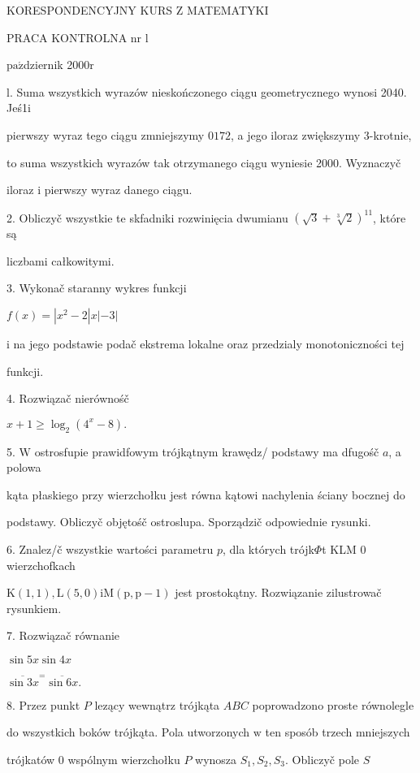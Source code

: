 \documentclass[a4paper,12pt]{article}
\begin{document}
KORESPONDENCYJNY KURS Z MATEMATYKI

PRACA KONTROLNA nr l

$\mathrm{p}\mathrm{a}\acute{\mathrm{z}}$dziernik 2$000\mathrm{r}$

l. Suma wszystkich wyrazów nieskończonego ciągu geometrycznego wynosi 2040. Jeś1i

pierwszy wyraz tego ciągu zmniejszymy $0172$, a jego iloraz zwiększymy 3-krotnie,

to suma wszystkich wyrazów tak otrzymanego ciągu wyniesie 2000. Wyznaczyč

iloraz $\mathrm{i}$ pierwszy wyraz danego ciągu.

2. Obliczyč wszystkie te skfadniki rozwinięcia dwumianu $(\sqrt{3}+\sqrt[3]{2})^{11}$, które są

liczbami całkowitymi.

3. Wykonač staranny wykres funkcji

$f(x)=|x^{2}-2|x|-3|$

i na jego podstawie podač ekstrema lokalne oraz przedzialy monotoniczności tej

funkcji.

4. Rozwiązač nierównośč

$x+1\geq\log_{2}(4^{x}-8).$

5. $\mathrm{W}$ ostrosfupie prawidfowym trójkątnym krawędz/ podstawy ma dfugośč $a$, a polowa

kąta płaskiego przy wierzchołku jest równa kątowi nachylenia ściany bocznej do

podstawy. Obliczyč objętośč ostroslupa. Sporządzič odpowiednie rysunki.

6. Znalez/č wszystkie wartości parametru $p$, dla których trójk$\Phi$t KLM $0$ wierzchofkach

$\mathrm{K}(1,1), \mathrm{L}(5,0)\mathrm{i}\mathrm{M}(\mathrm{p},\mathrm{p}-1)$ jest prostokątny. Rozwiązanie zilustrowač rysunkiem.

7. Rozwiązač równanie

$\sin 5x\sin 4x$

$\overline{\sin 3x}^{=}\overline{\sin 6x}.$

8. Przez punkt $P$ lezący wewnątrz trójkąta $ABC$ poprowadzono proste równolegle

do wszystkich boków trójkąta. Pola utworzonych $\mathrm{w}$ ten sposób trzech mniejszych

trójkatów $0$ wspólnym wierzchołku $P$ wynosza $S_{1}, S_{2}, S_{3}$. Obliczyč pole $S$
\end{document}
